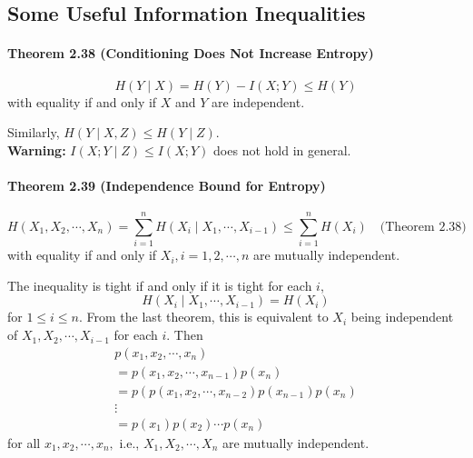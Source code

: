 \documentclass[8pt]{article}
\begin{document}
\subsection{Some Useful Information Inequalities}
\begin{tcolorbox}
\paragraph{Theorem 2.38 (Conditioning Does Not Increase Entropy)}
$$
H(Y \mid X)=H(Y)-I(X ; Y) \leq H(Y)
$$
with equality if and only if $X$ and $Y$ are independent.
\end{tcolorbox}
\noindent Similarly, $H(Y \mid X, Z) \leq H(Y \mid Z)$. \\
\textbf{Warning:} $I(X ; Y \mid Z) \leq I(X ; Y)$ does not hold in general.

\begin{tcolorbox}
\paragraph{Theorem 2.39 (Independence Bound for Entropy)}
$$
H\left(X_{1}, X_{2}, \cdots, X_{n}\right) =\sum_{i=1}^{n} H\left(X_{i} \mid X_{1}, \cdots, X_{i-1}\right)  \leq \sum_{i=1}^{n} H\left(X_{i}\right) \quad \text{(Theorem 2.38)}
$$
with equality if and only if $X_{i}, i=1,2, \cdots, n$ are mutually independent.
\end{tcolorbox}
The inequality is tight if and only if
it is tight for each $i$,
$$
H\left(X_{i} \mid X_{1}, \cdots, X_{i-1}\right)=H\left(X_{i}\right)
$$
for $1 \leq i \leq n .$ From the last theorem, this is equivalent to $X_{i}$ being independent of $X_{1}, X_{2}, \cdots, X_{i-1}$ for each $i .$ Then
$$
\begin{array}{l}
p\left(x_{1}, x_{2}, \cdots, x_{n}\right) \\
=p\left(x_{1}, x_{2}, \cdots, x_{n-1}\right) p\left(x_{n}\right) \\
=p\left(p\left(x_{1}, x_{2}, \cdots, x_{n-2}\right) p\left(x_{n-1}\right) p\left(x_{n}\right)\right. \\
\vdots \\
=p\left(x_{1}\right) p\left(x_{2}\right) \cdots p\left(x_{n}\right)
\end{array}
$$
for all $x_{1}, x_{2}, \cdots, x_{n},$ i.e., $X_{1}, X_{2}, \cdots, X_{n}$ are mutually independent.
\end{document}
